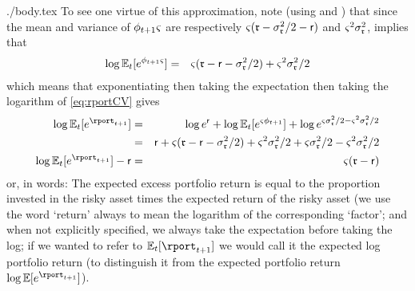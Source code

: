 \documentclass{bejournal}
\begin{document}
\begin{verbatimwrite}{./body.tex}
To see one virtue of this approximation, note (using  and ) that since the mean and variance of $\phi_{t+1} {\varsigma}$ are respectively ${\varsigma}(\mathfrak{r} - \sigma^{2}_{\mathfrak{r}}/2- \mathsf{r})$ and ${\varsigma}^{2} \sigma^{2}_{\mathfrak{r}}$,  implies that  
\begin{eqnarray}
 \log \mathbb{E}_{t}[e^{\phi_{t+1} {\varsigma}}] & = & {\varsigma} (\mathfrak{r} - \mathsf{r} - \sigma^{2}_{\mathfrak{r}}/2) + {\varsigma}^{2}\sigma^{2}_{\mathfrak{r}}/2 
\end{eqnarray}
which means that exponentiating then taking the expectation then taking the logarithm of \eqref{eq:rportCV} gives 
\begin{eqnarray}
   \log \Ex_{t}[e^{\rport_{t+1}}] & = & \log e^{\rfree} + \log \Ex_{t}[e^{\riskyshare \eprem_{t+1}}] + \log e^{\riskyshare\sigma^{2}_{\risky}/2 - \riskyshare^{2}\sigma^{2}_{\risky}/2}
\\ & = & 
\rfree + \riskyshare (\risky-\rfree-\sigma^{2}_{\risky}/2)+\riskyshare^{2}\sigma^{2}_{\risky}/2 +\riskyshare \sigma^{2}_{\risky}/2 - \riskyshare^{2}\sigma^{2}_{\risky}/2 
\\ \log \Ex_{t}[e^{\rport_{t+1}}] - \rfree & = &  \riskyshare (\risky-\rfree) \label{eq:rportDist}
\end{eqnarray}
or, in words: The expected excess portfolio return is equal to the proportion invested in the risky asset times the expected return of the risky asset (we use the word `return' always to mean the logarithm of the corresponding `factor'; and when not explicitly specified, we always take the expectation before taking the log; if we wanted to refer to $\Ex_{t}[\rport_{t+1}]$ we would call it the expected log portfolio return (to distinguish it from the expected portfolio return $\log \Ex[e^{\rport_{t+1}}]$).


\end{verbatimwrite}
\end{document}

